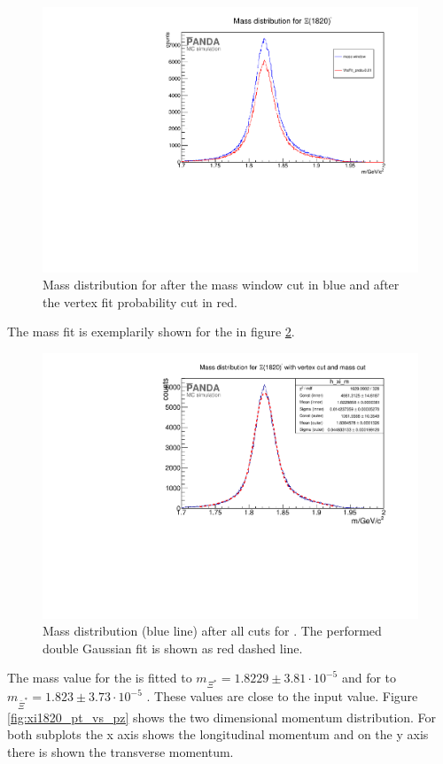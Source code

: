 	\begin{figure}
		\centering
		\includegraphics[width=1.\textwidth]{./plots/Xi1820/XiMinus1820_m_diffcuts.pdf}
		\caption{\propose Mass distribution for \excitedcascade after the mass window cut in blue and after the vertex fit probability cut in red.}
		\label{fig:xi1820_mass_diffcuts}
	
	\end{figure}
	The mass fit is exemplarily shown for the \excitedcascade in figure \ref{fig:xi1820_massfit}. 
	
	\begin{figure}
		\centering
		\includegraphics[width=1.\textwidth]{./plots/Xi1820/XiMinus1820_m_masscut.pdf}
		\caption{\propose Mass distribution (blue line) after all cuts for \excitedcascade. The performed double Gaussian fit is shown as red dashed line.}
		\label{fig:xi1820_massfit}
	\end{figure}
	The mass value for the \excitedcascade is fitted to $m_{\Xi^{*}} = 1.8229 \pm 3.81 \cdot 10^{-5}$ \massunit
	 and for \excitedanticascade to $m_{\bar{\Xi}^{*}} = 1.823 \pm 3.73\cdot 10^{-5}$ \massunit.
	These values are close to the input value.
	Figure \ref{fig:xi1820_pt_vs_pz} shows the two dimensional momentum distribution. For both subplots the x axis shows the longitudinal momentum
	and on the y axis there is shown the transverse momentum.
	
